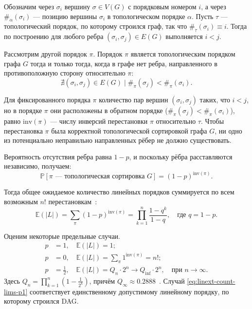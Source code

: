 Обозначим через $\sigma_i$ вершину $\sigma \in V(G)$ с порядковым
номером $i$, а через $\#_{\alpha}(\sigma_i)$ — позицию вершины
$\sigma_i$ в топологическом порядке $\alpha$. Пусть $\tau$ —
топологический порядок, по которому строился граф, так что
$\#_{\tau}(\sigma_i) \equiv i$. Тогда по построению для любого ребра
$(\sigma_i, \sigma_j) \in E(G)$ выполняется $i < j$.

Рассмотрим другой порядок $\pi$. Порядок $\pi$ является
топологическим порядком графа $G$ тогда и только тогда, когда в графе
нет ребра, направленного в противоположную сторону относительно $\pi$:
\begin{equation}
  \nexists (\sigma_i, \sigma_j) \in E(G) \mid \#_{\pi}(\sigma_j) <
  \#_{\pi}(\sigma_i).
\end{equation}

Для фиксированного порядка $\pi$ количество пар вершин $(\sigma_i,
\sigma_j)$ таких, что $i < j$, но в порядке $\pi$ они расположены в
обратном порядке ($\#_{\pi}(\sigma_j) < \#_{\pi}(\sigma_i)$), равно
$\text{inv}(\pi)$ — числу инверсий перестановки $\pi$ относительно
$\tau$. Чтобы перестановка $\pi$ была корректной топологической
сортировкой графа $G$, ни одно из потенциально неправильно
направленных рёбер не должно существовать.

Вероятность отсутствия ребра равна $1-p$, и поскольку рёбра
расставляются независимо, получаем:
\begin{equation}
  \mathbb{P}[\pi \text{ — топологическая сортировка } G] =
  (1-p)^{\text{inv}(\pi)}.
\end{equation}

Тогда общее ожидаемое количество линейных порядков суммируется по
всем возможным $n!$ перестановкам~\cite{q-factor}:
\begin{equation}
  \mathbb{E}(|L|) = \sum_{\pi}{(1-p)^{\text{inv}(\pi)}} =
  \prod_{k=1}^{n}{\frac{1-q^k}{1-q}}, \quad \text{где } q = 1-p.
\end{equation}

Оценим некоторые предельные случаи.
\begin{subequations}
  \label{eq:linext-count-lims}
  \begin{align}
    p &= 1,\quad \mathbb{E}(|L|) = 1; \label{eq:linext-count-lims-p1} \\
    p &= 0,\quad \mathbb{E}(|L|) = \sum_{\pi}{1^{\text{inv}(\pi)}} =
    n!; \label{eq:linext-count-lims-p0} \\
    p &= \frac{1}{2},\quad \mathbb{E}(|L|) = Q_n \cdot 2^n  \rightarrow
    Q_{\inf} \cdot 2^n, \quad
    \text{при } n \rightarrow \infty. \label{eq:linext-count-lims-p12}
  \end{align}
\end{subequations}
Здесь $Q_n = \prod_{k=1}^{n} \left(1 - \frac{1}{2^k}\right)$, причём
$Q_{\infty} \approx 0.2888$~\cite{oeis_A048651}.
Случай \eqref{eq:linext-count-lims-p1} соответствует единственному
допустимому линейному порядку, по которому строился DAG.

